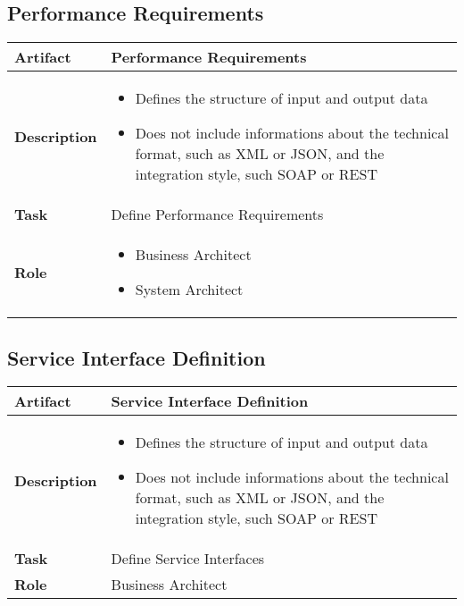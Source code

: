 \subsection{Performance Requirements}
\begin{tabularx}{\textwidth}{@{} l X @{}}
	\caption{Performance Requirements} \label{table:ch6_Artifact_Performance_Requirements}\\
	\toprule 
	\bfseries Artifact & Performance Requirements\\
	\midrule 
	\bfseries Description & 
	\begin{itemize}
		\item Defines the structure of input and output data
		\item Does not include informations about the technical format, such as \ac{XML} or \ac{JSON}, and the integration style, such SOAP or \ac{REST}
	\end{itemize}
	\\
	\midrule 
	\bfseries Task & Define Performance Requirements
	\\
	\midrule 
	\bfseries Role & 
	\begin{itemize}
		\item Business Architect
		\item System Architect
	\end{itemize}\\
	\bottomrule 
\end{tabularx}


\subsection{Service Interface Definition}
\begin{tabularx}{\textwidth}{@{} l X @{}}
	\caption{Service Interface Definition} \label{table:ch6_Artifact_Service_Interface_Definition}\\
	\toprule 
	\bfseries Artifact & Service Interface Definition\\
	\midrule 
	\bfseries Description & 
	\begin{itemize}
		\item Defines the structure of input and output data
		\item Does not include informations about the technical format, such as \ac{XML} or \ac{JSON}, and the integration style, such SOAP or \ac{REST}
	\end{itemize}
	\\
	\midrule 
	\bfseries Task & Define Service Interfaces 
	\\
	\midrule 
	\bfseries Role & Business Architect\\
	\bottomrule 
\end{tabularx}

